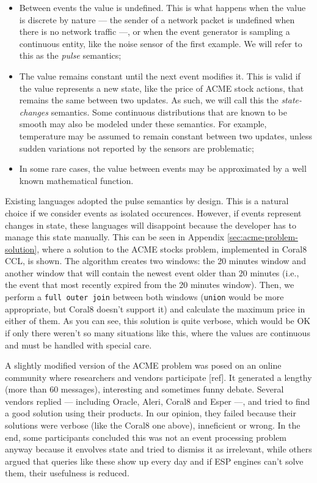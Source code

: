 \documentclass{report}
\begin{document}
\begin{itemize}
\item Between events the value is undefined. This is what happens when
  the value is discrete by nature --- the sender of a network packet
  is undefined when there is no network traffic ---, or when the event
  generator is sampling a continuous entity, like the noise sensor of
  the first example. We will refer to this as the \emph{pulse}
  semantics;
\item The value remains constant until the next event modifies
  it. This is valid if the value represents a new state, like the
  price of ACME stock actions, that remains the same between two
  updates. As such, we will call this the \emph{state-changes}
  semantics. Some continuous distributions that are known to be smooth
  may also be modeled under these semantics. For example, temperature
  may be assumed to remain constant between two updates, unless sudden
  variations not reported by the sensors are problematic;
\item In some rare cases, the value between events may be approximated
  by a well known mathematical function.
\end{itemize}

Existing languages adopted the pulse semantics by design. This is a
natural choice if we consider events as isolated occurences. However,
if events represent changes in state, these languages will disappoint
because the developer has to manage this state manually. This can be
seen in Appendix \ref{sec:acme-problem-solution}, where a solution to
the ACME stocks problem, implemented in Coral8 CCL, is shown. The
algorithm creates two windows: the 20 minutes window and another
window that will contain the newest event older than 20 minutes (i.e.,
the event that most recently expired from the 20 minutes
window). Then, we perform a \verb=full outer join= between both
windows (\verb=union= would be more appropriate, but Coral8 doesn't
support it) and calculate the maximum price in either of them. As you
can see, this solution is quite verbose, which would be OK if only
there weren't so many situations like this, where the values are
continuous and must be handled with special care.

A slightly modified version of the ACME problem was posed on an online
community where researchers and vendors participate [ref]. It
generated a lengthy (more than 60 messages), interesting and sometimes
funny debate. Several vendors replied --- including Oracle, Aleri,
Coral8 and Esper ---, and tried to find a good solution using their
products. In our opinion, they failed because their solutions were
verbose (like the Coral8 one above), inneficient or wrong. In the end,
some participants concluded this was not an event processing problem
anyway because it envolves state and tried to dismiss it as
irrelevant, while others argued that queries like these show up every
day and if ESP engines can't solve them, their usefulness is reduced.
\end{document}

